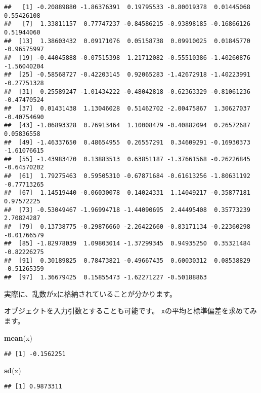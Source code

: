 \documentclass[]{bxjsarticle}
\newenvironment{Shaded}{\begin{snugshade}}{\end{snugshade}}
\newcommand{\KeywordTok}[1]{\textcolor[rgb]{0.13,0.29,0.53}{\textbf{#1}}}
\newcommand{\NormalTok}[1]{#1}
\begin{document}
\begin{verbatim}
##   [1] -0.20889880 -1.86376391  0.19795533 -0.80019378  0.01445068  0.55426108
##   [7]  1.33811157  0.77747237 -0.84586215 -0.93898185 -0.16866126  0.51944060
##  [13]  1.38603432  0.09171076  0.05158738  0.09910025  0.01845770 -0.96575997
##  [19] -0.44045888 -0.07515398  1.21712082 -0.55510386 -1.40260876 -1.56040204
##  [25] -0.58568727 -0.42203145  0.92065283 -1.42672918 -1.40223991 -0.27751328
##  [31]  0.25589247 -1.01434222 -0.48042818 -0.62363329 -0.81061236 -0.47470524
##  [37]  0.01431438  1.13046028  0.51462702 -2.00475867  1.30627037 -0.40754690
##  [43] -1.06893328  0.76913464  1.10008479 -0.40882094  0.26572687  0.05836558
##  [49] -1.46337650  0.48654955  0.26557291  0.34609291 -0.16930373 -1.61076615
##  [55] -1.43983470  0.13883513  0.63851187 -1.37661568 -0.26226845 -0.64570202
##  [61]  1.79275463  0.59505310 -0.67871684 -0.61613256 -1.80631192 -0.77713265
##  [67]  1.14519440 -0.06030078  0.14024331  1.14049217 -0.35877181  0.97572225
##  [73] -0.53049467 -1.96994718 -1.44090695  2.44495408  0.35773239  2.70824287
##  [79]  0.13738775 -0.29876660 -2.26422660 -0.83171134 -0.22360298 -0.01766579
##  [85] -1.82978039  1.09803014 -1.37299345  0.94935250  0.35321484 -0.82226275
##  [91]  0.30189825  0.78473821 -0.49667435  0.60030312  0.08538829 -0.51265359
##  [97]  1.36679425  0.15855473 -1.62271227 -0.50188863
\end{verbatim}

実際に、乱数が\texttt{x}に格納されていることが分かります。

オブジェクトを入力引数とすることも可能です。
\texttt{x}の平均と標準偏差を求めてみます。

\begin{Shaded}
\begin{Highlighting}[]
\KeywordTok{mean}\NormalTok{(x)}
\end{Highlighting}
\end{Shaded}

\begin{verbatim}
## [1] -0.1562251
\end{verbatim}

\begin{Shaded}
\begin{Highlighting}[]
\KeywordTok{sd}\NormalTok{(x)}
\end{Highlighting}
\end{Shaded}

\begin{verbatim}
## [1] 0.9873311
\end{verbatim}
\end{document}
